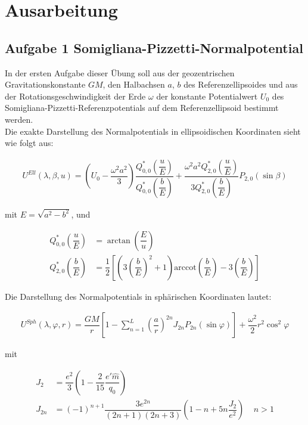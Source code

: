 \chapter*{Ausarbeitung}

\section*{Aufgabe 1 Somigliana-Pizzetti-Normalpotential}

In der ersten Aufgabe dieser Übung soll aus der geozentrischen Gravitationskonstante $GM$, den Halbachsen $a$, $b$ des Referenzellipsoides und aus der Rotationsgeschwindigkeit der Erde $\omega$ der konstante Potentialwert $U_0$ des Somigliana-Pizzetti-Referenzpotentials auf dem Referenzellipsoid bestimmt werden. \\

Die exakte Darstellung des Normalpotentials in ellipsoidischen Koordinaten sieht wie folgt aus:

\begin{align}
U^{Ell}(\lambda,\beta,u) = \left(U_0 - \dfrac{\omega^2 a^2}{3}\right) \dfrac{Q_{0,0}^{*}\left(\dfrac{u}{E}\right)}{{Q_{0,0}^{*}\left(\dfrac{b}{E}\right)}} + \dfrac{\omega^2 a^2 Q_{2,0}^{*}\left(\dfrac{u}{E}\right)}{3 Q_{2,0}^{*}\left(\dfrac{b}{E}\right)} P_{2,0}(\sin \beta)
\end{align}

mit $E = \sqrt{a^2 - b^2}$, und 

\begin{align}
Q_{0,0}^{*}\left(\dfrac{u}{E}\right) &= \arctan \left(\dfrac{E}{u}\right) \\
Q_{2,0}^{*}\left(\dfrac{b}{E}\right) &= \dfrac{1}{2} \left[\left(3 \left(\dfrac{b}{E}\right)^2+1\right) \text{arccot} \left(\dfrac{b}{E}\right)-3 \left(\dfrac{b}{E}\right)\right]
\end{align}

Die Darstellung des Normalpotentials in sphärischen Koordinaten lautet: 

\begin{align}
U^{Sph}(\lambda,\varphi,r)= \dfrac{GM}{r} \left[1-\sum_{n=1}^{L} \left(\dfrac{a}{r}\right)^{2n} J_{2n} P_{2n} (\sin \varphi)\right] + \dfrac{\omega^2}{2} r^2 \cos^2 \varphi
\end{align}

mit 

\begin{align*}
J_2 &= \dfrac{e^2}{3} \left(1-\dfrac{2}{15} \dfrac{e'\hat{m}}{q_0}\right) \\
J_{2n} &= (-1)^{n+1} \dfrac{3e^{2n}}{(2n+1)(2n+3)} \left(1-n+5n \dfrac{J_2}{e^2}\right) ~~~~~ n > 1 
\end{align*}


